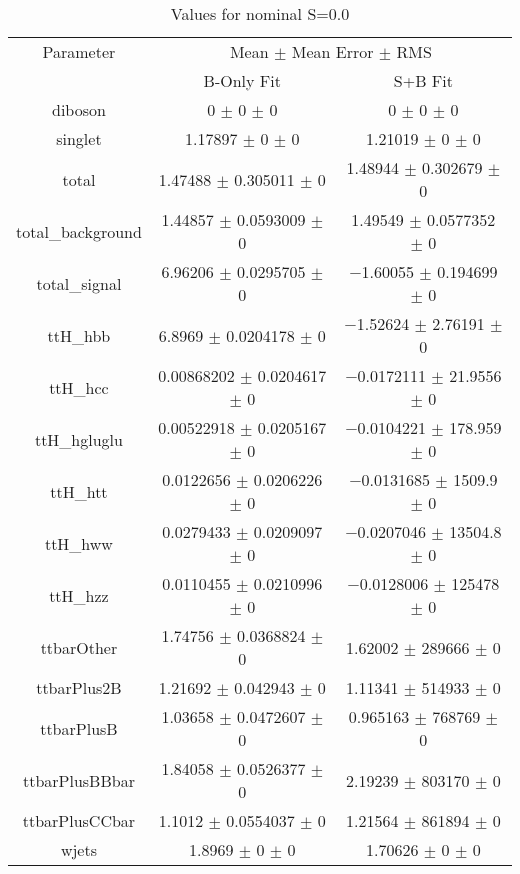 \begin{table}
\centering
\caption{Values for nominal S=0.0}
\begin{tabular}{ccc}
\toprule
Parameter & \multicolumn{2}{c}{Mean $\pm$ Mean Error $\pm$ RMS}\\
 & B-Only Fit & S+B Fit\\
\midrule
diboson & \num{0} $\pm$ \num{0} $\pm$ \num{0} & \num{0} $\pm$ \num{0} $\pm$ \num{0}\\
singlet & \num{1.17897} $\pm$ \num{0} $\pm$ \num{0} & \num{1.21019} $\pm$ \num{0} $\pm$ \num{0}\\
total & \num{1.47488} $\pm$ \num{0.305011} $\pm$ \num{0} & \num{1.48944} $\pm$ \num{0.302679} $\pm$ \num{0}\\
total\_background & \num{1.44857} $\pm$ \num{0.0593009} $\pm$ \num{0} & \num{1.49549} $\pm$ \num{0.0577352} $\pm$ \num{0}\\
total\_signal & \num{6.96206} $\pm$ \num{0.0295705} $\pm$ \num{0} & \num{-1.60055} $\pm$ \num{0.194699} $\pm$ \num{0}\\
ttH\_hbb & \num{6.8969} $\pm$ \num{0.0204178} $\pm$ \num{0} & \num{-1.52624} $\pm$ \num{2.76191} $\pm$ \num{0}\\
ttH\_hcc & \num{0.00868202} $\pm$ \num{0.0204617} $\pm$ \num{0} & \num{-0.0172111} $\pm$ \num{21.9556} $\pm$ \num{0}\\
ttH\_hgluglu & \num{0.00522918} $\pm$ \num{0.0205167} $\pm$ \num{0} & \num{-0.0104221} $\pm$ \num{178.959} $\pm$ \num{0}\\
ttH\_htt & \num{0.0122656} $\pm$ \num{0.0206226} $\pm$ \num{0} & \num{-0.0131685} $\pm$ \num{1509.9} $\pm$ \num{0}\\
ttH\_hww & \num{0.0279433} $\pm$ \num{0.0209097} $\pm$ \num{0} & \num{-0.0207046} $\pm$ \num{13504.8} $\pm$ \num{0}\\
ttH\_hzz & \num{0.0110455} $\pm$ \num{0.0210996} $\pm$ \num{0} & \num{-0.0128006} $\pm$ \num{125478} $\pm$ \num{0}\\
ttbarOther & \num{1.74756} $\pm$ \num{0.0368824} $\pm$ \num{0} & \num{1.62002} $\pm$ \num{289666} $\pm$ \num{0}\\
ttbarPlus2B & \num{1.21692} $\pm$ \num{0.042943} $\pm$ \num{0} & \num{1.11341} $\pm$ \num{514933} $\pm$ \num{0}\\
ttbarPlusB & \num{1.03658} $\pm$ \num{0.0472607} $\pm$ \num{0} & \num{0.965163} $\pm$ \num{768769} $\pm$ \num{0}\\
ttbarPlusBBbar & \num{1.84058} $\pm$ \num{0.0526377} $\pm$ \num{0} & \num{2.19239} $\pm$ \num{803170} $\pm$ \num{0}\\
ttbarPlusCCbar & \num{1.1012} $\pm$ \num{0.0554037} $\pm$ \num{0} & \num{1.21564} $\pm$ \num{861894} $\pm$ \num{0}\\
wjets & \num{1.8969} $\pm$ \num{0} $\pm$ \num{0} & \num{1.70626} $\pm$ \num{0} $\pm$ \num{0}\\
\bottomrule
\end{tabular}
\end{table}